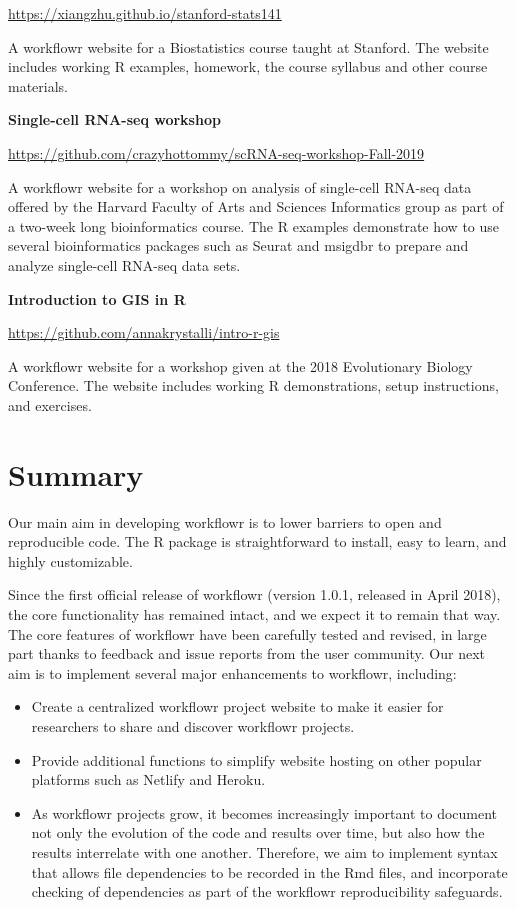 \documentclass[9pt,a4paper]{extarticle}
\begin{document}
\url{https://xiangzhu.github.io/stanford-stats141}

A workflowr website for a Biostatistics course taught at Stanford. The
website includes working R examples, homework, the course syllabus and
other course materials.

\textbf{Single-cell RNA-seq workshop}

\url{https://github.com/crazyhottommy/scRNA-seq-workshop-Fall-2019}

A workflowr website for a workshop on analysis of single-cell RNA-seq
data offered by the Harvard Faculty of Arts and Sciences Informatics
group as part of a two-week long bioinformatics course. The R examples
demonstrate how to use several bioinformatics packages such as Seurat
and msigdbr to prepare and analyze single-cell RNA-seq data sets.

\textbf{Introduction to GIS in R}

\url{https://github.com/annakrystalli/intro-r-gis}

A workflowr website for a workshop given at the 2018 Evolutionary
Biology Conference. The website includes working R demonstrations, setup
instructions, and exercises.


\section*{Summary}

Our main aim in developing workflowr is to lower barriers to open and
reproducible code. The R package is straightforward to install, easy to
learn, and highly customizable.

Since the first official release of workflowr (version 1.0.1, released
in April 2018), the core functionality has remained intact, and we
expect it to remain that way. The core features of workflowr have been
carefully tested and revised, in large part thanks to feedback and issue
reports from the user community. Our next aim is to implement several
major enhancements to workflowr, including:

\begin{itemize}

\item Create a centralized workflowr project website to make it easier
for researchers to share and discover workflowr projects.

\item Provide additional functions to simplify website hosting on other
popular platforms such as Netlify and Heroku.

\item As workflowr projects grow, it becomes increasingly important to
document not only the evolution of the code and results over time, but
also how the results interrelate with one another. Therefore, we aim to
implement syntax that allows file dependencies to be recorded in the Rmd
files, and incorporate checking of dependencies as part of the workflowr
reproducibility safeguards.

\end{itemize}
\end{document}
